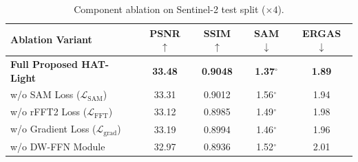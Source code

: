 \begin{table}[t]
\centering
\caption{Component ablation on Sentinel-2 test split ($\times 4$).}
\label{tab:ablation_results}
\footnotesize
\renewcommand{\arraystretch}{1.12}
\setlength{\tabcolsep}{3.5pt}
\begin{tabular*}{\columnwidth}{@{\extracolsep{\fill}} l cccc @{}}
\toprule
\textbf{Ablation Variant} & \textbf{PSNR} $\uparrow$ & \textbf{SSIM} $\uparrow$ & \textbf{SAM} $\downarrow$ & \textbf{ERGAS} $\downarrow$ \\
\midrule
\textbf{Full Proposed HAT-Light} & \textbf{33.48} & \textbf{0.9048} & \textbf{1.37}$^\circ$ & \textbf{1.89} \\
w/o SAM Loss ($\mathcal{L}_{\text{SAM}}$) & 33.31 & 0.9012 & 1.56$^\circ$ & 1.94 \\
w/o rFFT2 Loss ($\mathcal{L}_{\text{FFT}}$) & 33.12 & 0.8985 & 1.49$^\circ$ & 1.98 \\
w/o Gradient Loss ($\mathcal{L}_{\text{grad}}$) & 33.19 & 0.8994 & 1.46$^\circ$ & 1.96 \\
w/o DW-FFN Module & 32.97 & 0.8936 & 1.52$^\circ$ & 2.01 \\
\bottomrule
\end{tabular*}
\end{table}
